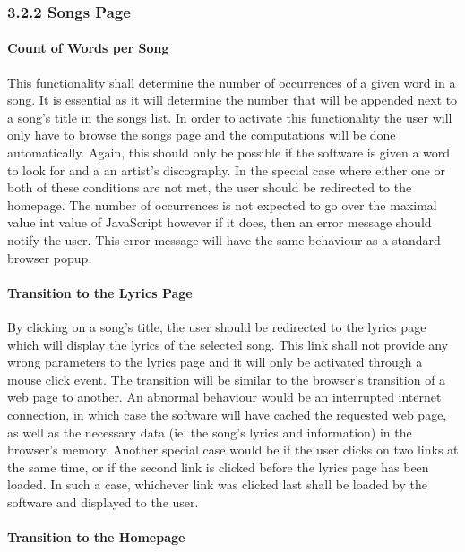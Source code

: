 \documentclass[]{article}
\begin{document}
\subsubsection{3.2.2 Songs Page}\label{songs-page}

\paragraph{Count of Words per Song}\label{count-of-words-per-song}

This functionality shall determine the number of occurrences of a given
word in a song. It is essential as it will determine the number that
will be appended next to a song's title in the songs list. In order to
activate this functionality the user will only have to browse the songs
page and the computations will be done automatically. Again, this should
only be possible if the software is given a word to look for and a an
artist's discography. In the special case where either one or both of
these conditions are not met, the user should be redirected to the
homepage. The number of occurrences is not expected to go over the
maximal value int value of JavaScript however if it does, then an error
message should notify the user. This error message will have the same
behaviour as a standard browser popup.

\paragraph{Transition to the Lyrics
Page}\label{transition-to-the-lyrics-page}

By clicking on a song's title, the user should be redirected to the
lyrics page which will display the lyrics of the selected song. This
link shall not provide any wrong parameters to the lyrics page and it
will only be activated through a mouse click event. The transition will
be similar to the browser's transition of a web page to another. An
abnormal behaviour would be an interrupted internet connection, in which
case the software will have cached the requested web page, as well as
the necessary data (ie, the song's lyrics and information) in the
browser's memory. Another special case would be if the user clicks on
two links at the same time, or if the second link is clicked before the
lyrics page has been loaded. In such a case, whichever link was clicked
last shall be loaded by the software and displayed to the user.

\paragraph{Transition to the Homepage}\label{transition-to-the-homepage}
\end{document}
